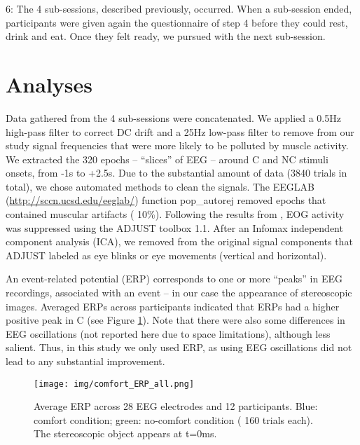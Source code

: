\documentclass{template/llncs}
\begin{document}
6: The 4 sub-sessions, described previously, occurred. When a sub-session ended, participants were given again the questionnaire of step 4 before they could rest, drink and eat. Once they felt ready, we pursued with the next sub-session.

\section{Analyses}\label{analyses}

\label{sec:analyses}





Data gathered from the 4 sub-sessions were concatenated. We applied a 0.5Hz high-pass filter to correct DC drift and a 25Hz low-pass filter to remove from our study signal frequencies that were more likely to be polluted by muscle activity. We extracted the 320 epochs -- ``slices'' of EEG -- around C and NC stimuli onsets, from -1s to +2.5s. Due to the substantial amount of data (3840 trials in total), we chose automated methods to clean the signals. The EEGLAB (\url{http://sccn.ucsd.edu/eeglab/}) function pop\_autorej removed epochs that contained muscular artifacts ( 10\%). Following the results from \cite{Ghaderi2013}, EOG activity was suppressed using the ADJUST toolbox 1.1. After an Infomax independent component analysis (ICA), we removed from the original signal components that ADJUST labeled as eye blinks or eye movements (vertical and horizontal).

An event-related potential (ERP) corresponds to one or more ``peaks'' in EEG recordings, associated with an event -- in our case the appearance of stereoscopic images. Averaged ERPs across participants indicated that ERPs had a higher positive peak in C (see Figure \ref{fig:erp}). Note that there were also some differences in EEG oscillations (not reported here due to space limitations), although less salient. Thus, in this study we only used ERP, as using EEG oscillations did not lead to any substantial improvement.
\begin{figure}[htbp]
\centering
\texttt{[image: img/comfort\_ERP\_all.png]}
\caption{Average ERP across 28 EEG electrodes and 12 participants. Blue: comfort condition; green: no-comfort condition ( 160 trials each). The stereoscopic object appears at t=0ms.\label{fig:erp}}
\end{figure}
\end{document}

